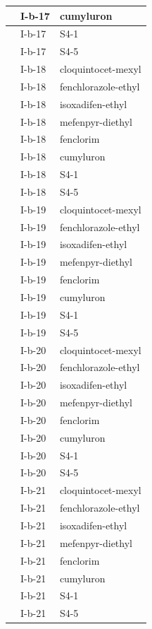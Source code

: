 \documentclass[11pt,a4paper]{article}
\begin{document}
\begin{table}[h]
\begin{tabular}{|l|l|l|}
 & I-b-17 & cumyluron \\ \hline
 & I-b-17 & S4-1 \\ \hline
 & I-b-17 & S4-5 \\ \hline
 & I-b-18 & cloquintocet-mexyl \\ \hline
 & I-b-18 & fenchlorazole-ethyl \\ \hline
 & I-b-18 & isoxadifen-ethyl \\ \hline
 & I-b-18 & mefenpyr-diethyl \\ \hline
 & I-b-18 & fenclorim \\ \hline
 & I-b-18 & cumyluron \\ \hline
 & I-b-18 & S4-1 \\ \hline
 & I-b-18 & S4-5 \\ \hline
 & I-b-19 & cloquintocet-mexyl \\ \hline
 & I-b-19 & fenchlorazole-ethyl \\ \hline
 & I-b-19 & isoxadifen-ethyl \\ \hline
 & I-b-19 & mefenpyr-diethyl \\ \hline
 & I-b-19 & fenclorim \\ \hline
 & I-b-19 & cumyluron \\ \hline
 & I-b-19 & S4-1 \\ \hline
 & I-b-19 & S4-5 \\ \hline
 & I-b-20 & cloquintocet-mexyl \\ \hline
 & I-b-20 & fenchlorazole-ethyl \\ \hline
 & I-b-20 & isoxadifen-ethyl \\ \hline
 & I-b-20 & mefenpyr-diethyl \\ \hline
 & I-b-20 & fenclorim \\ \hline
 & I-b-20 & cumyluron \\ \hline
 & I-b-20 & S4-1 \\ \hline
 & I-b-20 & S4-5 \\ \hline
 & I-b-21 & cloquintocet-mexyl \\ \hline
 & I-b-21 & fenchlorazole-ethyl \\ \hline
 & I-b-21 & isoxadifen-ethyl \\ \hline
 & I-b-21 & mefenpyr-diethyl \\ \hline
 & I-b-21 & fenclorim \\ \hline
 & I-b-21 & cumyluron \\ \hline
 & I-b-21 & S4-1 \\ \hline
 & I-b-21 & S4-5 \\ \hline

\end{tabular}
\end{table}
\end{document}
